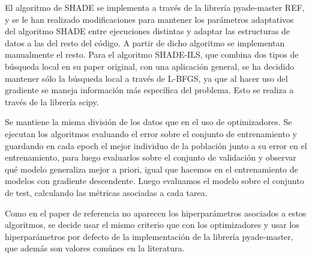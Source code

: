 El algoritmo de SHADE se implementa a través de la librería pyade-master REF, y se le han realizado modificaciones para mantener los parámetros adaptativos del algoritmo SHADE entre ejecuciones distintas y adaptar las estructuras de datos a las del resto del código. A partir de dicho algoritmo se implementan manualmente el resto. Para el algoritmo SHADE-ILS, que combina dos tipos de búsqueda local en su paper original, con una aplicación general, se ha decidido mantener sólo la búsqueda local a través de L-BFGS, ya que al hacer uso del gradiente se maneja información más específica del problema. Esto se realiza a través de la librería scipy.

Se mantiene la misma división de los datos que en el uso de optimizadores. Se ejecutan los algoritmos evaluando el error sobre el conjunto de entrenamiento y guardando en cada epoch el mejor individuo de la población junto a su error en el entrenamiento, para luego evaluarlos sobre el conjunto de validación y observar qué modelo generaliza mejor a priori, igual que hacemos en el entrenamiento de modelos con gradiente descendente. Luego evaluamos el modelo sobre el conjunto de test, calculando las métricas asociadas a cada tarea.

Como en el paper de referencia no aparecen los hiperparámetros asociados a estos algoritmos, se decide usar el mismo criterio que con los optimizadores y usar los hiperparámetros por defecto de la implementación de la librería pyade-master, que además son valores comúnes en la literatura. 




